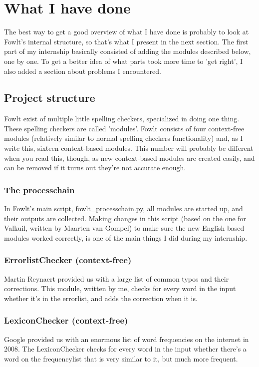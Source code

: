 \documentclass[12pt]{article}
\let\stdsection\section
\renewcommand\section{\newpage\stdsection}
\begin{document}
\section{What I have done}
The best way to get a good overview of what I have done is probably to look at Fowlt's internal structure, so that's what I present in the next section. The first part of my internship basically consisted of adding the modules described below, one by one. To get a better idea of what parts took more time to 'get right', I also added a section about problems I encountered.

\subsection{Project structure}
Fowlt exist of multiple little spelling checkers, specialized in doing one thing. These spelling checkers are called 'modules'. Fowlt consists of four context-free modules (relatively similar to normal spelling checkers functionality) and, as I write this, sixteen context-based modules. This number will probably be different when you read this, though, as new context-based modules are created easily, and can be removed if it turns out they're not accurate enough.

\subsubsection{The processchain}
In Fowlt's main script, fowlt\_processchain.py, all modules are started up, and their outputs are collected. Making changes in this script (based on the one for Valkuil, written by Maarten van Gompel) to make sure the new English based modules worked correctly, is one of the main things I did during my internship.

\subsubsection{ErrorlistChecker (context-free)}
Martin Reynaert provided us with a large list of common typos and their corrections. This module, written by me, checks for every word in the input whether it's in the errorlist, and adds the correction when it is.

\subsubsection{LexiconChecker (context-free)}
Google provided us with an enormous list of word frequencies on the internet in 2008. The LexiconChecker checks for every word in the input whether there's a word on the frequencylist that is very similar to it, but much more frequent.
\end{document}
